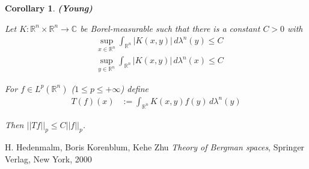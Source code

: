\documentclass[12pt]{article}
\theoremstyle{definition}
\theoremstyle{plain}
\newtheorem{Cor}{Corollary}
\begin{document}
\begin{Cor}
\textbf{(Young)}

Let $K \colon \mathbb{R}^n \times \mathbb{R}^n \to \mathbb{C}$ be Borel-measurable such that there is a constant $C > 0$ with
\begin{align*}
& \sup_{x \in \mathbb{R}^n} \int_{\mathbb{R}^n} |K(x,y)| \,d\lambda^n(y) \leq C \\
& \sup_{y \in \mathbb{R}^n} \int_{\mathbb{R}^n} |K(x,y)| \,d\lambda^n(x) \leq C
\end{align*}

For $f \in L^p(\mathbb{R}^n)$ ($1 \leq p \leq +\infty$) define
\begin{align*}
T(f)(x) &:= \int_{\mathbb{R}^n} K(x,y) f(y)\,d\lambda^n(y)
\end{align*}

Then $||T f||_p \leq C ||f||_p$. 
\end{Cor}

\begin{thebibliography}{99}
 H. Hedenmalm, Boris Korenblum, Kehe Zhu \emph{Theory of Bergman spaces}, Springer Verlag, New York, 2000
\end{thebibliography}

\end{document}
